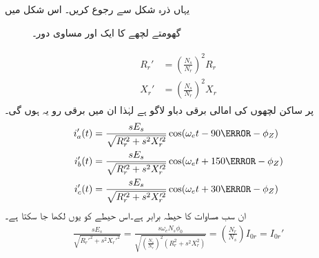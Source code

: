 یہاں ذرہ شکل   سے رجوع کریں۔ اس شکل میں
\begin{figure}
\centering
\caption{گھومتے لچھے کا ایک اور مساوی دور۔}
\label{شکل_امالی_گھومتے_لچھے_کا_دوسرا_مساوی_دور}
\end{figure}
%
\begin{gather}
\begin{aligned}\label{مساوات_امالی_گھومتے_مزاحمت_امالہ_دوسری_جانب}
R_r'&=\left(\frac{N_s}{N_r} \right)^2 R_r\\
X_r'&=\left(\frac{N_s}{N_r} \right)^2 X_r
\end{aligned}
\end{gather} 
پر ساکن لچھوں کی امالی برقی دباو  لاگو ہے لہٰذا ان میں برقی رو یہ ہوں گی۔
\begin{gather}
\begin{aligned}\label{مساوات_امالی_تین_رو}
i_a'(t)&=\frac{s E_s}{\sqrt{R_r'^2+s^2 X_r'^2}} \cos (\omega_e t -90\degree -\phi_Z)\\
i_b'(t)&=\frac{s E_s}{\sqrt{R_r'^2+s^2 X_r'^2}} \cos (\omega_e t +150\degree -\phi_Z)\\
i_c'(t)&=\frac{s E_s}{\sqrt{R_r'^2+s^2 X_r'^2}} \cos (\omega_e t +30\degree -\phi_Z)
\end{aligned}
\end{gather}
ان سب مساوات کا حیطہ برابر ہے۔اس حیطے کو یوں لکھا جا سکتا ہے۔
\begin{align}\label{مساوات_امالی_رو_دباو_تعلق_الف}
\frac{s E_s}{\sqrt{R_r'^2+s^2 X_r'^2}}=\frac{s \omega_e N_s \phi_0}{\sqrt{\left( \frac{N_s}{N_r}\right)^2 \left(R_r^2+s^2X_r^2 \right)}}=\left(\frac{N_r}{N_s}\right) I_{0r}=I_{0r}'
\end{align}
